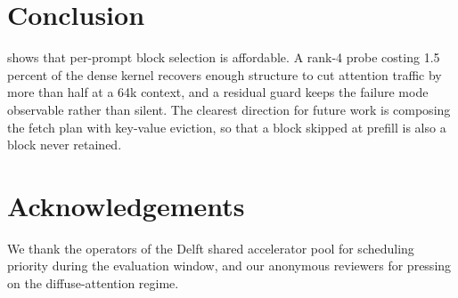 \section{Conclusion}
\label{sec:conclusion}

\sysname{} shows that per-prompt block selection is affordable. A rank-4 probe
costing 1.5 percent of the dense kernel recovers enough structure to cut
attention traffic by more than half at a 64k context, and a residual guard
keeps the failure mode observable rather than silent. The clearest direction
for future work is composing the fetch plan with key-value eviction, so that a
block skipped at prefill is also a block never retained.

\section*{Acknowledgements}
We thank the operators of the Delft shared accelerator pool for scheduling
priority during the evaluation window, and our anonymous reviewers for pressing
on the diffuse-attention regime.
